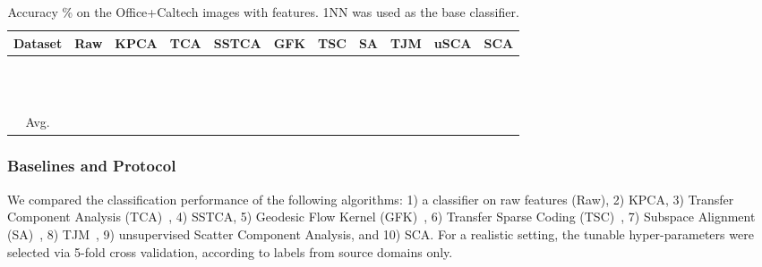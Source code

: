 \documentclass[10pt,journal,compsoc]{IEEEtran}
\begin{document}
\begin{table*}[!htb]
\caption{Accuracy \% on the Office+Caltech images with  features.
    1NN was used as the base classifier.}
    \vspace{-1em}
\centering
\begin{tabular}{| c || c | c | c  | c | c | c | c | c | c | c | }
\hline
Dataset           & Raw     & KPCA       & TCA     & SSTCA & GFK & TSC & SA      & TJM     & uSCA    & SCA    \\
\hline
\hline
 &  &   &  &  &  &  &  &  &  & {\color{red}}                                 \\
 &  &   &  &  &  &  &  & {\color{red}} &  &                                   \\
 &  &   &  &  &  &  & {\color{red}} &  &  &                                  \\
 &  &   &  &  &  &  &  &  &  & {\color{red}}                                 \\
 &  & {\color{red}}   & {\color{red}} & {\color{red}}   & {\color{red}} &   {\color{red}} & {\color{red}}   & {\color{red}} & {\color{red}}   & {\color{red}}                                   \\
 &  &   &  &  &  &  &  & {\color{red}} &  &                                  \\
 &  &   &  &  &  &  &  & {\color{red}} &  &                                  \\
 &  &   &  &  &  &  & {\color{red}} &  &  &                                  \\
 &  &   &  &  &  &  &  & {\color{red} } &  &                                  \\
 &  &   &  &  &  &  &  & {\color{red}} &  &                                  \\
 &  &   &  &  & &  &  &  &  & {\color{red} }                                 \\
 &  &   &  &  &  &  &  &  &  &  {\color{red}}                               \\
\hline
\hline
Avg.              &  &   &  &  &  &  &  &  &  & {\color{red} } \\
\hline
\end{tabular}
\label{tab:office_results_decaf_cv}
\end{table*}



\vspace{-0.5em}
\subsubsection{Baselines and Protocol}
\label{sec:exp1_baseline}
We compared the classification performance of the following algorithms:
1) a classifier on raw features (Raw),
2) KPCA,
3) Transfer Component Analysis (TCA)~\cite{Pan2011},
4) SSTCA,
5) Geodesic Flow Kernel (GFK)~\cite{Gong:2012aa},
6) Transfer Sparse Coding (TSC)~\cite{Long:2013aa},
7) Subspace Alignment (SA)~\cite{Fernando:2013aa},
8) TJM~\cite{Long2014a},
9) unsupervised Scatter Component Analysis, and
10) SCA.
For a realistic setting, the tunable hyper-parameters were selected via 5-fold cross validation, according to labels from source domains only.
\end{document}
